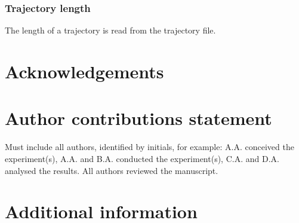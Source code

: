 \documentclass[fleqn,10pt]{wlscirep}
\begin{document}
\subsubsection*{Trajectory length}
The length of a trajectory is read from the trajectory file.








\section*{Acknowledgements}


\section*{Author contributions statement}

Must include all authors, identified by initials, for example:
A.A. conceived the experiment(s),  A.A. and B.A. conducted the experiment(s), C.A. and D.A. analysed the results.  All authors reviewed the manuscript. 

\section*{Additional information}



\end{document}
